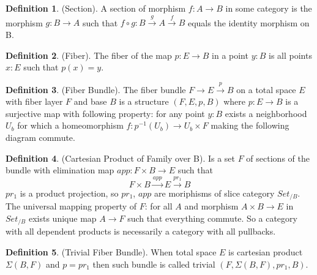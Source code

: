 \documentclass{article}
\theoremstyle{definition}
\newtheorem{definition}{Definition}
\def\mapright#1{\xrightarrow{{#1}}}
\begin{document}
\begin{definition} (Section).
A section of morphism $f: A \rightarrow B$ in some category is the morphism $g: B \rightarrow A$
such that $f \circ g: B \mapright{g} A \mapright{f} B$ equals the identity morphism on B.
\end{definition}

\begin{definition} (Fiber).
The fiber of the map $p: E \rightarrow B$ in a point $y: B$ is all points $x: E$ such that $p(x)=y$.
\end{definition}

\begin{definition} (Fiber Bundle).
The fiber bundle $ F \rightarrow E \mapright{p} B$ on a total space $E$ with fiber layer $F$ and base $B$ is a
structure $(F,E,p,B)$ where $p: E \rightarrow B$ is a surjective map with following property:
for any point $y: B$ exists a neighborhood $U_b$ for which a homeomorphism $f: p^{-1}(U_b) \rightarrow U_b \times F$
making the following diagram commute.
\begin{center}
\end{center}
\end{definition}

\begin{definition} (Cartesian Product of Family over B).
Is a set $F$ of sections of the bundle with elimination map $app : F \times B \rightarrow E$ such that
\begin{equation}
F \times B \mapright{app} E \mapright{pr_1} B
\end{equation}
$pr_1$ is a product projection, so $pr_1$, $app$ are moriphisms
of slice category $Set_{/B}$. The universal mapping property of $F$:
for all $A$ and morphism $A \times B \rightarrow E$ in $Set_{/B}$ exists
unique map $A \rightarrow F$ such that everything commute. So a category
with all dependent products is necessarily a category with all pullbacks.
\end{definition}

\begin{definition} (Trivial Fiber Bundle).
When total space $E$ is cartesian product $\Sigma(B,F)$ and $p = pr_1$
then such bundle is called trivial $(F,\Sigma(B,F),pr_1,B)$.
\end{definition}
\end{document}
